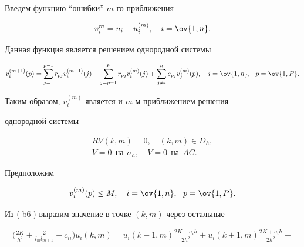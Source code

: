 \begin{pf}


Введем функцию ``ошибки'' $m$-го приближения


$$


v_{i}^{m} = u_i - u_i^{(m)}, \quad i=\ov{1,n}.


$$





Данная функция является решением однородной системы


$$


v_{i}^{(m+1)}(p) =


\sum\limits_{j = 1}^{p-1}r_{pj}v_{i}^{(m+1)}(j)


+ \sum\limits_{j = p+1}^{P}r_{pj}v_{i}^{(m)}(j)


+ \sum\limits_{j\ne i}^n e_{pj} v_{j}^{(m)} (p),


\quad i=\ov{1,n},\ \ p=\ov{1,P}.


$$


Таким образом, $v_i^{(m)}$ является и $m$-м приближением решения


однородной системы


\begin{gather*}


RV(k,m)=0, \quad (k,m)\in D_h, \\


V=0\ \ \text{на} \ \ \sigma_h,\quad V=0 \ \ \text{на} \ \ AC.


\end{gather*}





Предположим


\begin{equation}\label{110}


v_i^{ (m)}(p) \leq M, \quad i=\ov{1,n},\ \ p=\ov{1,P}.


\end{equation}





Из (\ref{b6}) выразим значение в точке $(k,m)$ через остальные


\begin{gather*}


\bigg(\frac{2K}{h^2} + \frac{2}{l_ml_{m+1}} - c_{ii} \bigg)u_i(k,m) =


u_i(k-1,m)\frac{2K - a_ih}{2h^2} + u_i(k+1,m)\frac{2K+a_ih}{2h^2} +\\



\end{gather*}
\end{pf}
